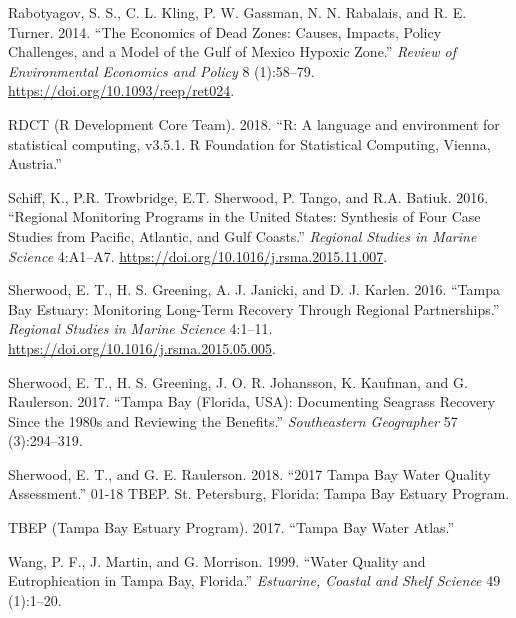 \documentclass[]{article}
\begin{document}
\leavevmode\hypertarget{ref-Rabotyagov14}{}%
Rabotyagov, S. S., C. L. Kling, P. W. Gassman, N. N. Rabalais, and R. E.
Turner. 2014. ``The Economics of Dead Zones: Causes, Impacts, Policy
Challenges, and a Model of the Gulf of Mexico Hypoxic Zone.''
\emph{Review of Environmental Economics and Policy} 8 (1):58--79.
\url{https://doi.org/10.1093/reep/ret024}.

\leavevmode\hypertarget{ref-RDCT18}{}%
RDCT (R Development Core Team). 2018. ``R: A language and environment
for statistical computing, v3.5.1. R Foundation for Statistical
Computing, Vienna, Austria.''

\leavevmode\hypertarget{ref-Schiff16}{}%
Schiff, K., P.R. Trowbridge, E.T. Sherwood, P. Tango, and R.A. Batiuk.
2016. ``Regional Monitoring Programs in the United States: Synthesis of
Four Case Studies from Pacific, Atlantic, and Gulf Coasts.''
\emph{Regional Studies in Marine Science} 4:A1--A7.
\url{https://doi.org/10.1016/j.rsma.2015.11.007}.

\leavevmode\hypertarget{ref-Sherwood16}{}%
Sherwood, E. T., H. S. Greening, A. J. Janicki, and D. J. Karlen. 2016.
``Tampa Bay Estuary: Monitoring Long-Term Recovery Through Regional
Partnerships.'' \emph{Regional Studies in Marine Science} 4:1--11.
\url{https://doi.org/10.1016/j.rsma.2015.05.005}.

\leavevmode\hypertarget{ref-Sherwood17}{}%
Sherwood, E. T., H. S. Greening, J. O. R. Johansson, K. Kaufman, and G.
Raulerson. 2017. ``Tampa Bay (Florida, USA): Documenting Seagrass
Recovery Since the 1980s and Reviewing the Benefits.''
\emph{Southeastern Geographer} 57 (3):294--319.

\leavevmode\hypertarget{ref-Sherwood18}{}%
Sherwood, E. T., and G. E. Raulerson. 2018. ``2017 Tampa Bay Water
Quality Assessment.'' 01-18 TBEP. St. Petersburg, Florida: Tampa Bay
Estuary Program.

\leavevmode\hypertarget{ref-TBEP17}{}%
TBEP (Tampa Bay Estuary Program). 2017. ``Tampa Bay Water Atlas.''

\leavevmode\hypertarget{ref-Wang99}{}%
Wang, P. F., J. Martin, and G. Morrison. 1999. ``Water Quality and
Eutrophication in Tampa Bay, Florida.'' \emph{Estuarine, Coastal and
Shelf Science} 49 (1):1--20.
\end{document}
